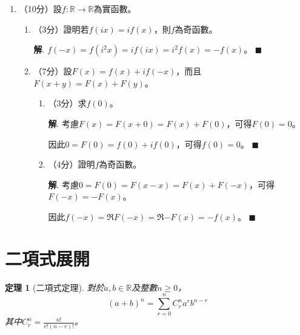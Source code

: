 \documentclass[12pt]{article}
\newtheorem*{theorem}{定理}
\newenvironment*{sol}{\par \textbf{解}.}{\hfill$\blacksquare$}
\begin{document}
\begin{enumerate}
\begin{enumerate}
\begin{enumerate}
\begin{sol}
                    故此，代$y=\frac{x}{2}\in\mathbb{R}$可得$f(x)\geq 0$。
                \end{sol}
                \item （1分）由此，證明$f$的偶函數部分必定大於或等於$0$。\begin{sol}
                    根據(c)i及(b)，$$\frac{f(x)+f(-x)}{2}\geq \frac{0+0}{2}=0$$
                \end{sol}
            \end{enumerate}
        \end{enumerate}
        \item （10分）設$f:\mathbb{R}\to\mathbb{R}$為實函數。\begin{enumerate}
            \item （3分）證明若$f(ix)=if(x)$，則$f$為奇函數。\begin{sol}
                $f(-x)=f(i^2x)=if(ix)=i^2f(x)=-f(x)$。
            \end{sol}
            \item （7分）設$F(x)=f(x)+if(-x)$，而且$F(x+y)=F(x)+F(y)$。\begin{enumerate}
                \item （3分）求$f(0)$。\begin{sol}
                    考慮$F(x)=F(x+0)=F(x)+F(0)$，可得$F(0)=0$。

                    因此$0=F(0)=f(0)+if(0)$，可得$f(0)=0$。
                \end{sol}
                \item （4分）證明$f$為奇函數。\begin{sol}
                    考慮$0=F(0)=F(x-x)=F(x)+F(-x)$，可得$F(-x)=-F(x)$。

                    因此$f(-x)=\Re{F(-x)}=\Re{-F(x)}=-f(x)$。
                \end{sol}
            \end{enumerate}
        \end{enumerate}
    \end{enumerate}

    \section*{二項式展開}

    \begin{theorem}[二項式定理]
        對於$a,b\in\mathbb{R}$及整數$n\geq 0$，$$(a+b)^n=\sum_{r=0}^{n}C_r^n a^rb^{n-r}$$其中$C_r^n=\frac{n!}{r!(n-r)!}$。
    \end{theorem}
\end{document}
